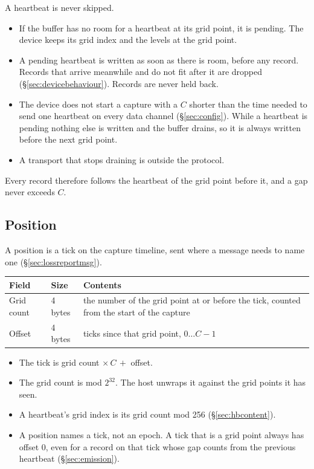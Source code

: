 \documentclass[11pt,a4paper]{article}
\newcommand{\sref}[1]{\S\ref{#1}}
\begin{document}
A heartbeat is never skipped.

\begin{itemize}
  \item If the buffer has no room for a heartbeat at its grid point, it is pending. The
        device keeps its grid index and the levels at the grid point.
  \item A pending heartbeat is written as soon as there is room, before any record.
        Records that arrive meanwhile and do not fit after it are dropped
        (\sref{sec:devicebehaviour}). Records are never held back.
  \item The device does not start a capture with a $C$ shorter than the time needed to
        send one heartbeat on every data channel (\sref{sec:config}). While a
        heartbeat is pending nothing else is written and the buffer drains, so it is
        always written before the next grid point.
  \item A transport that stops draining is outside the protocol.
\end{itemize}

Every record therefore follows the heartbeat of the grid point before it, and a gap
never exceeds $C$.

\subsection{Position}\label{sec:position}

A position is a tick on the capture timeline, sent where a message needs to name one
(\sref{sec:lossreportmsg}).

\begin{tabularx}{\linewidth}{@{}l l L@{}}
\toprule
\textbf{Field} & \textbf{Size} & \textbf{Contents} \\
\midrule
Grid count & 4 bytes & the number of the grid point at or before the tick, counted from the start of the capture \\
Offset & 4 bytes & ticks since that grid point, $0 \ldots C-1$ \\
\bottomrule
\end{tabularx}

\begin{itemize}
  \item The tick is grid count $\times\, C\, +$ offset.
  \item The grid count is mod $2^{32}$. The host unwraps it against the grid points it
        has seen.
  \item A heartbeat's grid index is its grid count mod 256 (\sref{sec:hbcontent}).
  \item A position names a tick, not an epoch. A tick that is a grid point always has
        offset 0, even for a record on that tick whose gap counts from the previous
        heartbeat (\sref{sec:emission}).
\end{itemize}
\end{document}
